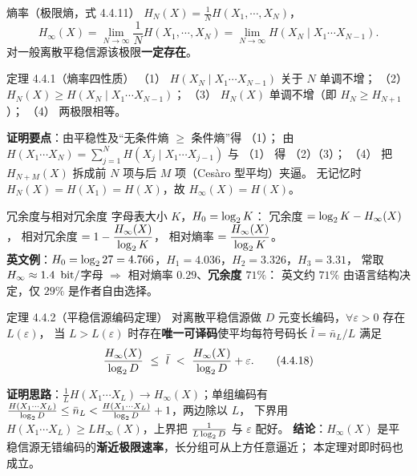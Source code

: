 \begin{defbox}{熵率（极限熵，式 4.4.11）}
$H_N(X)=\frac1N H(X_1,\cdots,X_N)$，
\begin{equation}
H_\infty(X)=\lim_{N\to\infty}\frac1NH(X_1,\cdots,X_N)
=\lim_{N\to\infty}H\left(X_N\mid X_1\cdots X_{N-1}\right).
\tag{4.4.11}
\end{equation}
对一般离散平稳信源该极限\textbf{一定存在}。
\end{defbox}

\begin{thmbox}{定理 4.4.1（熵率四性质）}
（1） $H(X_N\mid X_1\cdots X_{N-1})$ 关于 $N$ 单调不增；
（2） $H_N(X)\ge H(X_N\mid X_1\cdots X_{N-1})$；
（3） $H_N(X)$ 单调不增（即 $H_N\ge H_{N+1}$）；
（4） 两极限相等。
\end{thmbox}
\textbf{证明要点}：由平稳性及“无条件熵 $\ge$ 条件熵”得 （1）；
由 $H(X_1\cdots X_N)=\sum_{j=1}^{N}H(X_j\mid X_1\cdots X_{j-1})$ 与 （1） 得 （2）（3）；
（4） 把 $H_{N+M}(X)$ 拆成前 $N$ 项与后 $M$ 项（Cesàro 型平均）夹逼。
无记忆时 $H_N(X)=H(X_1)=H(X)$，故 $H_\infty(X)=H(X)$。

\begin{keypoint}{冗余度与相对冗余度}
字母表大小 $K$，$H_0=\log_{2} K$：\quad
冗余度 $=\log_{2} K-H_\infty(X)$，
相对冗余度 $=1-\dfrac{H_\infty(X)}{\log_{2} K}$，
相对熵率 $=\dfrac{H_\infty(X)}{\log_{2} K}$。\\
\textbf{英文例}：$H_0=\log_{2}27=4.766$，$H_1=4.036$，$H_2=3.326$，$H_3=3.31$，
常取 $H_\infty\approx1.4\ \,\text{bit}/$字母 $\Rightarrow$ 相对熵率 $0.29$、\textbf{冗余度 $71\%$}：
英文约 $71\%$ 由语言结构决定，仅 $29\%$ 是作者自由选择。
\end{keypoint}

\begin{thmbox}{定理 4.4.2（平稳信源编码定理）}
对离散平稳信源做 $D$ 元变长编码，$\forall\varepsilon>0$ 存在 $L(\varepsilon)$，
当 $L>L(\varepsilon)$ 时存在\textbf{唯一可译码}使平均每符号码长 $\bar l=\bar n_L/L$ 满足
\begin{equation}
\frac{H_\infty(X)}{\log_{2} D}\ \le\ \bar l\ <\ \frac{H_\infty(X)}{\log_{2} D}+\varepsilon .
\tag{4.4.18}
\end{equation}
\end{thmbox}
\textbf{证明思路}：$\frac1LH(X_1\cdots X_L)\to H_\infty(X)$；单组编码有
$\frac{H(X_1\cdots X_L)}{\log_{2} D}\le\bar n_L<\frac{H(X_1\cdots X_L)}{\log_{2} D}+1$，两边除以 $L$，
下界用 $H(X_1\cdots X_L)\ge L H_\infty(X)$，上界把 $\frac{1}{L\log_{2} D}$ 与 $\varepsilon$ 配好。
\textbf{结论}：$H_\infty(X)$ 是平稳信源无错编码的\textbf{渐近极限速率}，长分组可从上方任意逼近；
本定理对即时码也成立。

